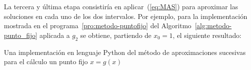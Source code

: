 \begin{example}
\begin{itemize}
  \end{itemize}
  La \textsf{tercera y última etapa} consistiría en
  aplicar~(\ref{eq:MAS}) para aproximar las soluciones en cada uno de
  los dos intervalos. Por ejemplo, para la implementación mostrada en
  el programa~\ref{pro:metodo-puntofijo} del
  Algoritmo~\ref{alg:metodo-punto_fijo} aplicada a $g_2$ se obtiene,
  partiendo de $x_0=1$, el siguiente resultado:
  \begin{pythonoutput}
  \end{pythonoutput}
  \label{ex:punto-fijo-1}
  \begin{program}
    \caption{Una implementación en lenguaje Python del método de
      aproximaciones sucesivas para el cálculo un punto fijo $x=g(x)$}
    \label{pro:metodo-puntofijo}
  \end{program}
\end{example}


